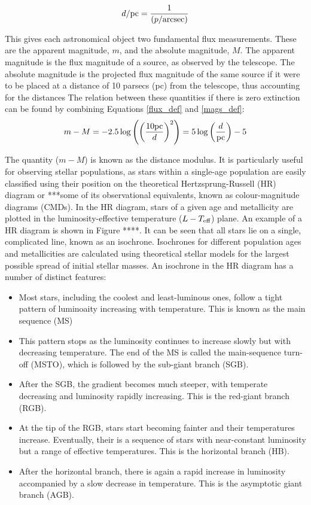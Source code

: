 \documentclass[12pt, a4paper]{report}
\begin{document}
\begin{equation}
d/\textnormal{pc} = \frac{1}{(p/\textnormal{arcsec})}
\end{equation}

This gives each astronomical object two fundamental flux measurements. These are the apparent magnitude, $m$, and the absolute magnitude, $M$. The apparent magnitude is the flux magnitude of a source, as observed by the telescope. The absolute magnitude is the projected flux magnitude of the same source if it were to be placed at a distance of 10 parsecs (pc) from the telescope, thus accounting for the distances The relation between these quantities if there is zero extinction can be found by combining Equations \ref{flux_def} and \ref{mags_def}:
\begin{equation}
\label{distance_modulus}
m - M = -2.5\log \left( \left(\frac{10\textnormal{pc}}{d}\right)^{2} \right) = 5\log\left(\frac{d}{\textnormal{pc}}\right) - 5
\end{equation}

The quantity ($m - M$) is known as the distance modulus. It is particularly useful for observing stellar populations, as stars within a single-age population are easily classified using their position on the theoretical Hertzsprung-Russell (HR) diagram or ***some of its observational equivalents, known as colour-magnitude diagrams (CMDs). In the HR diagram, stars of a given age and metallicity are plotted in the luminosity-effective temperature ($L-T_{\textnormal{eff}}$) plane. An example of a HR diagram is shown in Figure ****. It can be seen that all stars lie on a single, complicated line, known as an isochrone. Isochrones for different population ages and metallicities are calculated using theoretical stellar models for the largest possible spread of initial stellar masses. An isochrone in the HR diagram has a number of distinct features:
\begin{itemize}
\item Most stars, including the coolest and least-luminous ones, follow a tight pattern of luminoaity increasing with temperature. This is known as the main sequence (MS)
\item This pattern stops as the luminosity continues to increase slowly but with decreasing temperature. The end of the MS is called the main-sequence turn-off (MSTO), which is followed by the sub-giant branch (SGB).
\item After the SGB, the gradient becomes much steeper, with temperate decreasing and luminosity rapidly increasing. This is the red-giant branch (RGB).
\item At the tip of the RGB, stars start becoming fainter and their temperatures increase. Eventually, their is a sequence of stars with near-constant luminosity but a range of effective temperatures. This is the horizontal branch (HB).
\item After the horizontal branch, there is again a rapid increase in luminosity accompanied by a slow decrease in temperature. This is the asymptotic giant branch (AGB).
\end{itemize}
\end{document}
